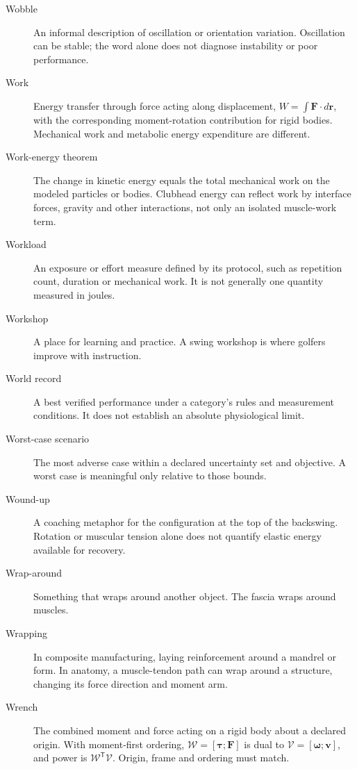 \begin{description}
\item[Wobble] An informal description of oscillation or orientation variation. Oscillation can be stable; the word alone does not diagnose instability or poor performance.

\item[Work] Energy transfer through force acting along displacement, $W=\int\mathbf{F}\cdot d\mathbf{r}$, with the corresponding moment-rotation contribution for rigid bodies. Mechanical work and metabolic energy expenditure are different.

\item[Work-energy theorem] The change in kinetic energy equals the total mechanical work on the modeled particles or bodies. Clubhead energy can reflect work by interface forces, gravity and other interactions, not only an isolated muscle-work term.

\item[Workload] An exposure or effort measure defined by its protocol, such as repetition count, duration or mechanical work. It is not generally one quantity measured in joules.

\item[Workshop] A place for learning and practice. A swing workshop is where golfers improve with instruction.

\item[World record] A best verified performance under a category's rules and measurement conditions. It does not establish an absolute physiological limit.

\item[Worst-case scenario] The most adverse case within a declared uncertainty set and objective. A worst case is meaningful only relative to those bounds.

\item[Wound-up] A coaching metaphor for the configuration at the top of the backswing. Rotation or muscular tension alone does not quantify elastic energy available for recovery.

\item[Wrap-around] Something that wraps around another object. The fascia wraps around muscles.

\item[Wrapping] In composite manufacturing, laying reinforcement around a mandrel or form. In anatomy, a muscle-tendon path can wrap around a structure, changing its force direction and moment arm.

\item[Wrench] The combined moment and force acting on a rigid body about a declared origin. With moment-first ordering, $\mathcal{W}=[\boldsymbol{\tau};\mathbf{F}]$ is dual to $\mathcal{V}=[\boldsymbol{\omega};\mathbf{v}]$, and power is $\mathcal{W}^\mathsf{T}\mathcal{V}$. Origin, frame and ordering must match.


\end{description}
